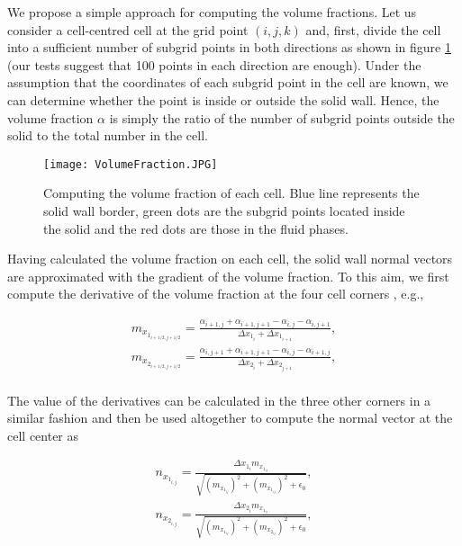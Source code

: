 \documentclass[review]{elsarticle}
\begin{document}
We propose a simple approach for computing the volume fractions. Let us consider a cell-centred cell at the grid point $(i,j,k)$ and, first, divide the cell into a sufficient number of subgrid points in both directions as shown in figure \ref{fig:VolumeFraction} (our tests suggest that 100 points in each direction are enough). Under the assumption that the coordinates of each subgrid point in the cell are known, we can determine whether the point is inside or outside the solid wall. Hence, the volume fraction $\alpha$ is simply the ratio of the number of subgrid points outside the solid to the total number  in the cell.
 \begin{figure} [H]
    \begin{center}
     \texttt{[image: VolumeFraction.JPG]}
\caption{Computing the volume fraction of each cell. Blue line represents the solid wall border, green dots are the subgrid points located inside the solid and the red dots are those in the fluid phases.}
\label{fig:VolumeFraction}
     \end{center}
     \end{figure}
Having calculated the volume fraction on each cell, the solid wall normal vectors are approximated with the gradient of the volume fraction. To this aim, we first compute the  derivative of the volume fraction at the four cell corners \citep{Satoshi2012}, e.g.,
\begin{linenomath}\begin{equation} \label{NormalVectors_part1}
\begin{gathered}
m_{x_{1_{i+1/2,j+1/2}}} = \frac{\alpha_{i+1,j}+\alpha_{i+1,j+1}-\alpha_{i,j}-\alpha_{i,j+1}}{\Delta x_{1_i}+ \Delta x_{1_{i+1}}},\\
m_{x_{2_{i+1/2,j+1/2}}} = \frac{\alpha_{i,j+1}+\alpha_{i+1,j+1}-\alpha_{i,j}-\alpha_{i+1,j}}{\Delta x_{2_i}+ \Delta x_{2_{j+1}}},\\
 \end{gathered}
\end{equation}\end{linenomath}
The value of the derivatives can be calculated in the three other corners in a similar fashion and then be used altogether to compute the normal vector at the cell center as
\begin{linenomath}\begin{equation} \label{NormalVectors_part2}
\begin{gathered}
n_{x_{1_{i,j}}} = \frac{ \Delta x_{1_i} m_{x_{1_{ij}}}  } {\sqrt{   {(m_{x_{1_{ij}}}   ) }^2 + {(m_{x_{1_{ij}}}   ) }^2+\epsilon_0}},\\
n_{x_{2_{i,j}}} = \frac{ \Delta x_{2_i} m_{x_{1_{ij}}}  } {\sqrt{   {(m_{x_{1_{ij}}}   ) }^2 + {(m_{x_{2_{ij}}}   ) }^2+\epsilon_0}},
 \end{gathered}
\end{equation}\end{linenomath}
\end{document}
